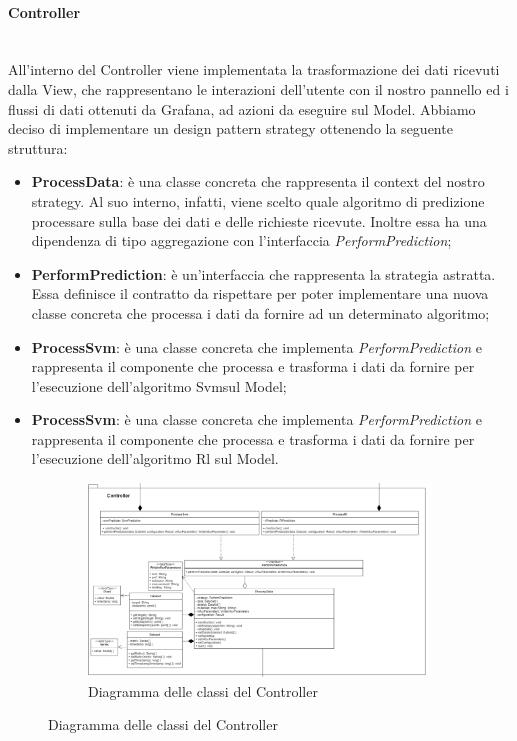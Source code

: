\paragraph{Controller} \mbox{}\\ [1mm]
All'interno del Controller viene implementata la trasformazione dei dati ricevuti dalla View, che rappresentano le interazioni dell'utente con il nostro pannello ed i flussi di dati ottenuti da Grafana\glo, ad azioni da eseguire sul Model.
Abbiamo deciso di implementare un design pattern strategy ottenendo la seguente struttura:
\begin{itemize}
	\item \textbf{ProcessData}: è una classe concreta che rappresenta il context del nostro strategy. Al suo interno, infatti, viene scelto quale algoritmo di predizione processare sulla base dei dati e delle richieste ricevute. Inoltre essa ha una dipendenza di tipo aggregazione con l'interfaccia \textit{PerformPrediction};
	\item \textbf{PerformPrediction}: è un'interfaccia che rappresenta la strategia astratta. Essa definisce il contratto da rispettare per poter implementare una nuova classe concreta che processa i dati da fornire ad un determinato algoritmo;
	\item \textbf{ProcessSvm}: è una classe concreta che implementa \textit{PerformPrediction} e rappresenta il componente che processa e trasforma i dati da fornire per l'esecuzione dell'algoritmo Svm\glosp sul Model;
	\item \textbf{ProcessSvm}: è una classe concreta che implementa \textit{PerformPrediction} e rappresenta il componente che processa e trasforma i dati da fornire per l'esecuzione dell'algoritmo Rl sul Model.
\end{itemize}
\mbox{}
\begin{landscape}
	\begin{figure}
		\begin{figure} [H]
			\includegraphics[width=\linewidth]{./img/Diagrammi/controller-plug-in.png}
			\caption{Diagramma delle classi del Controller}
		\end{figure}
	\end{figure}
\end{landscape}
